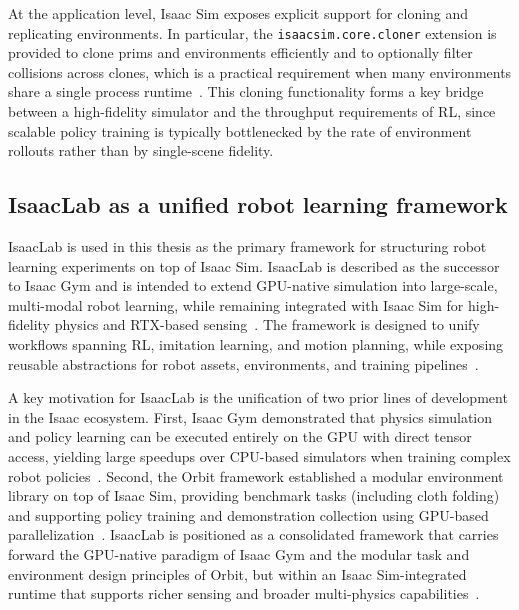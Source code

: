 At the application level, Isaac Sim exposes explicit support for cloning and replicating environments. In particular, the \texttt{isaacsim.core.cloner} extension is provided to clone prims and environments efficiently and to optionally filter collisions across clones, which is a practical requirement when many environments share a single process runtime~\cite{nvidia_isaac_sim_510_extensions_api}. This cloning functionality forms a key bridge between a high-fidelity simulator and the throughput requirements of \ac{RL}, since scalable policy training is typically bottlenecked by the rate of environment rollouts rather than by single-scene fidelity.

\subsection{IsaacLab as a unified robot learning framework}
IsaacLab is used in this thesis as the primary framework for structuring robot learning experiments on top of Isaac Sim. IsaacLab is described as the successor to Isaac Gym and is intended to extend GPU-native simulation into large-scale, multi-modal robot learning, while remaining integrated with Isaac Sim for high-fidelity physics and RTX-based sensing~\cite{Mittal2025IsaacLab}. The framework is designed to unify workflows spanning \ac{RL}, imitation learning, and motion planning, while exposing reusable abstractions for robot assets, environments, and training pipelines~\cite{Mittal2025IsaacLab}.

A key motivation for IsaacLab is the unification of two prior lines of development in the Isaac ecosystem. First, Isaac Gym demonstrated that physics simulation and policy learning can be executed entirely on the \ac{GPU} with direct tensor access, yielding large speedups over CPU-based simulators when training complex robot policies~\cite{Makoviychuk2021IsaacGym}. Second, the Orbit framework established a modular environment library on top of Isaac Sim, providing benchmark tasks (including cloth folding) and supporting policy training and demonstration collection using GPU-based parallelization~\cite{Mittal2023Orbit}. IsaacLab is positioned as a consolidated framework that carries forward the GPU-native paradigm of Isaac Gym and the modular task and environment design principles of Orbit, but within an Isaac Sim-integrated runtime that supports richer sensing and broader multi-physics capabilities~\cite{Mittal2025IsaacLab}.


